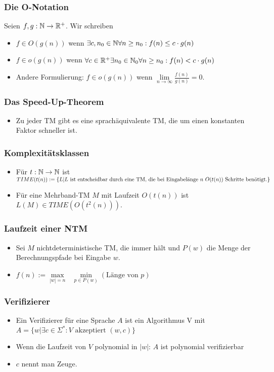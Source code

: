 \documentclass{beamer}
\newcommand{\F}{\Sigma^*}
\newcommand{\N}{\ensuremath \mathbb{N}}
\newcommand{\R}{\ensuremath \mathbb{R}}
\begin{document}
\begin{frame}
\frametitle{Die O-Notation}
Seien $f,g:\N\to\R^+$. Wir schreiben
\begin{itemize}
\item $f\in O(g(n))$ wenn $\exists c,n_0\in\N \forall n\geq n_0: f(n)\leq c\cdot g(n)$\pause
\item $f\in o(g(n))$ wenn $\forall c\in\R^+ \exists n_0\in\N_0 \forall n\geq n_0: f(n)< c\cdot g(n)$
\item Andere Formulierung: $f\in o(g(n))$ wenn $\lim\limits_{n\to\infty}\frac{f(n)}{g(n)}=0$.
\end{itemize}
\end{frame}

\begin{frame}
\frametitle{Das Speed-Up-Theorem}
\begin{itemize}
\item Zu jeder TM gibt es eine sprachäquivalente TM, die um einen konstanten Faktor schneller ist.
\end{itemize}
\end{frame}

\begin{frame}
\frametitle{Komplexitätsklassen}
\begin{itemize}
\item Für $t:\N\to\N$ ist $TIME(t(n)):=\{L|L\text{ ist entscheidbar durch eine TM, die bei Eingabelänge $n$} \newline \text{ $O(t(n))$ Schritte benötigt.}\}$
\item Für eine Mehrband-TM $M$ mit Laufzeit $O(t(n))$ ist $L(M)\in TIME(O(t^2(n)))$.
\end{itemize}
\end{frame}

\begin{frame}
\frametitle{Laufzeit einer NTM}
\begin{itemize}
\item Sei $M$ nichtdeterministische TM, die immer hält und $P(w)$ die Menge der Berechnungspfade bei Eingabe $w$.
\item $f(n):=\max\limits_{|w|=n}\text{ } \min\limits_{p \in P(w)}(\text{Länge von $p$})$
\end{itemize}
\end{frame}

\begin{frame}
\frametitle{Verifizierer}
\begin{itemize}
\item Ein Verifizierer für eine Sprache $A$ ist ein Algorithmus V mit $A=\{w|\exists c\in\F : V\text{ akzeptiert } (w,c)\}$
\item Wenn die Laufzeit von $V$ polynomial in $|w|$: $A$ ist polynomial verifizierbar
\item $c$ nennt man Zeuge.
\end{itemize}
\end{frame}
\end{document}
